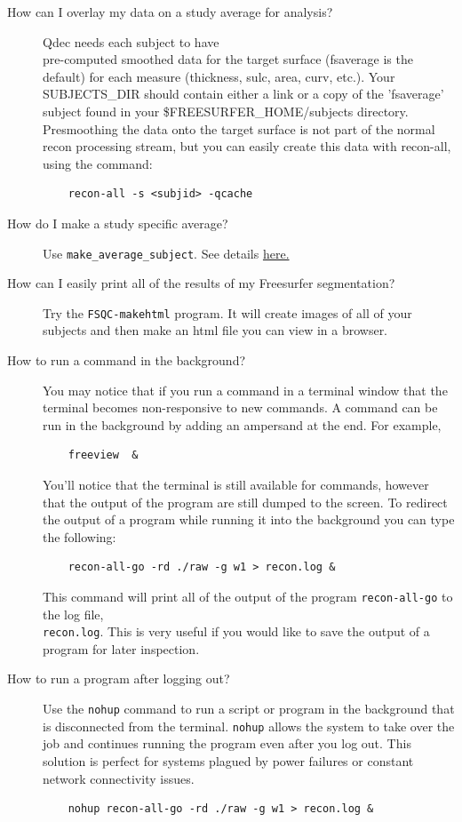 \documentclass[paper=a4, fontsize=11pt]{scrartcl} %
\numberwithin{equation}{section} %
\numberwithin{figure}{section} %
\numberwithin{table}{section} %
\begin{document}
\begin{appendices}
\begin{description}
\item[How can I overlay my data on a study average for analysis?] Qdec needs each subject to have \\ pre-computed smoothed data for the target surface (fsaverage is the default) for each measure (thickness, sulc, area, curv, etc.). Your SUBJECTS\_DIR should contain either a link or a copy of the 'fsaverage' subject found in your \$FREESURFER\_HOME/subjects directory. Presmoothing the data onto the target surface is not part of the normal recon processing stream, but you can easily create this data with recon-all, using the command: 
	\begin{lstlisting}
	recon-all -s <subjid> -qcache
	\end{lstlisting}

\item[How do I make a study specific average?]  Use \texttt{make\_average\_subject}.  See details  \href{http://surfer.nmr.mgh.harvard.edu/fswiki/make_average_subject}{here.}

\item[How can I easily print all of the results of my Freesurfer segmentation?]  Try the \texttt{FSQC-makehtml} program.  It will create images of all of your subjects and then make an html file you can view in a browser.

\item[How to run a command in the background?]  You may notice that if you run a command in a terminal window that the terminal becomes non-responsive to new commands.  A command can be run in the background by adding an ampersand at the end.  For example,
	\begin{lstlisting}
	freeview  &
	\end{lstlisting}

You'll notice that the terminal is still available for commands, however that the output of the program are still dumped to the screen.  To redirect the output of a program while running it into the background you can type the following:
	\begin{lstlisting}
	recon-all-go -rd ./raw -g w1 > recon.log &
	\end{lstlisting}
	
This command will print all of the output of the program \texttt{recon-all-go} to the log file, ~\\\texttt{recon.log}.  This is very useful if you would like to save the output of a program for later inspection.  

\item[How to run a program after logging out?]  Use the \texttt{nohup} command to run a script or program in the background that is disconnected from the terminal.  \texttt{nohup} allows the system to take over the job and continues running the program even after you log out.  This solution is perfect for systems plagued by power failures or constant network connectivity issues.
	\begin{lstlisting}
	nohup recon-all-go -rd ./raw -g w1 > recon.log &
	\end{lstlisting}



\end{description}
\end{appendices}
\end{document}
